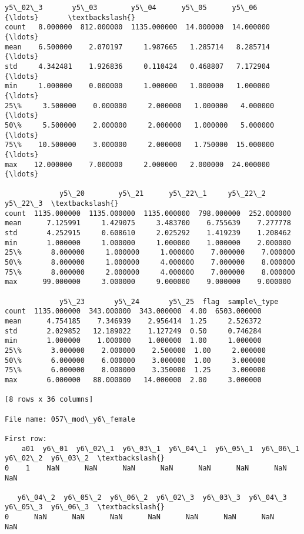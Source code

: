 \documentclass[11pt]{article}
\begin{document}
\begin{Verbatim}[commandchars=\\\{\}]
         y5\_02\_3       y5\_03        y5\_04      y5\_05      y5\_06     {\ldots}       \textbackslash{}
count   8.000000  812.000000  1135.000000  14.000000  14.000000     {\ldots}        
mean    6.500000    2.070197     1.987665   1.285714   8.285714     {\ldots}        
std     4.342481    1.926836     0.110424   0.468807   7.172904     {\ldots}        
min     1.000000    0.000000     1.000000   1.000000   1.000000     {\ldots}        
25\%     3.500000    0.000000     2.000000   1.000000   4.000000     {\ldots}        
50\%     5.500000    2.000000     2.000000   1.000000   5.000000     {\ldots}        
75\%    10.500000    3.000000     2.000000   1.750000  15.000000     {\ldots}        
max    12.000000    7.000000     2.000000   2.000000  24.000000     {\ldots}        

             y5\_20        y5\_21      y5\_22\_1     y5\_22\_2     y5\_22\_3  \textbackslash{}
count  1135.000000  1135.000000  1135.000000  798.000000  252.000000   
mean      7.125991     1.429075     3.483700    6.755639    7.277778   
std       4.252915     0.608610     2.025292    1.419239    1.208462   
min       1.000000     1.000000     1.000000    1.000000    2.000000   
25\%       8.000000     1.000000     1.000000    7.000000    7.000000   
50\%       8.000000     1.000000     4.000000    7.000000    8.000000   
75\%       8.000000     2.000000     4.000000    7.000000    8.000000   
max      99.000000     3.000000     9.000000    9.000000    9.000000   

             y5\_23       y5\_24       y5\_25  flag  sample\_type  
count  1135.000000  343.000000  343.000000  4.00  6503.000000  
mean      4.754185    7.346939    2.956414  1.25     2.526372  
std       2.029852   12.189022    1.127249  0.50     0.746284  
min       1.000000    1.000000    1.000000  1.00     1.000000  
25\%       3.000000    2.000000    2.500000  1.00     2.000000  
50\%       6.000000    6.000000    3.000000  1.00     3.000000  
75\%       6.000000    8.000000    3.350000  1.25     3.000000  
max       6.000000   88.000000   14.000000  2.00     3.000000  

[8 rows x 36 columns]

File name: 057\_mod\_y6\_female

First row: 
    a01  y6\_01  y6\_02\_1  y6\_03\_1  y6\_04\_1  y6\_05\_1  y6\_06\_1  y6\_02\_2  y6\_03\_2  \textbackslash{}
0    1    NaN      NaN      NaN      NaN      NaN      NaN      NaN      NaN   

   y6\_04\_2  y6\_05\_2  y6\_06\_2  y6\_02\_3  y6\_03\_3  y6\_04\_3  y6\_05\_3  y6\_06\_3  \textbackslash{}
0      NaN      NaN      NaN      NaN      NaN      NaN      NaN      NaN   


\end{Verbatim}
\end{document}
